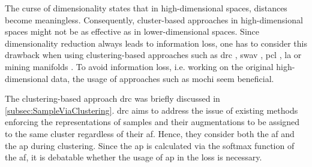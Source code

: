 The curse of dimensionality states that in high-dimensional spaces, distances become meaningless.
Consequently, cluster-based approaches in high-dimensional spaces might not be as effective as in lower-dimensional spaces.
Since dimensionality reduction always leads to information loss, one has to consider this drawback when using clustering-based approaches 
such as \ac{drc} \citet{DRC_2020}, \ac{swav} \citet{swav_2020}, \ac{pcl} \citet{PCL_2021}, 
\ac{la} \citet{local_aggr_2019} or mining manifolds \citet{mining_manifolds_2018}.
To avoid information loss, i.e. working on the original high-dimensional data, 
the usage of approaches such as \ac{mochi} \citet{mochi_2020} seem beneficial.

The clustering-based approach \ac{drc} \citet{DRC_2020} was briefly discussed in \autoref{subsec:SampleViaClustering}.
\ac{drc} aims to address the issue of existing methods enforcing the representations of samples 
and their augmentations to be assigned to the same cluster regardless of their \ac{af}.
Hence, they consider both the \ac{af} and the \ac{ap} during clustering.
Since the \ac{ap} is calculated via the softmax function of the \ac{af}, 
it is debatable whether the usage of \ac{ap} in the loss is necessary.